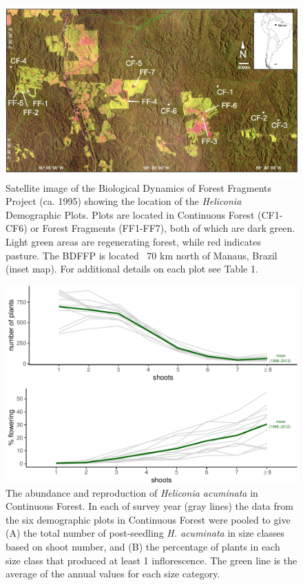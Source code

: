 \documentclass[
  man, donotrepeattitle,floatsintext]{apa6}
\begin{document}
\endgroup

\newpage

\begin{figure}[h]
\includegraphics[width=1\linewidth]{Bruna_etal_MetadataS1_files/figure-latex/map-1} \caption{Satellite image of the Biological Dynamics of Forest Fragments Project (ca. 1995) showing the location of the \textit{Heliconia} Demographic Plots. Plots are located in Continuous Forest (CF1-CF6) or Forest Fragments (FF1-FF7), both of which are dark green. Light green areas are regenerating forest, while red indicates pasture. The BDFFP is located ~70 km north of Manaus, Brazil (inset map). For additional details on each plot see Table 1.}\label{fig:map}
\end{figure}

\newpage

\begin{figure}
\centering
\includegraphics{Bruna_etal_MetadataS1_files/figure-latex/repro-1.pdf}
\caption{\label{fig:repro}The abundance and reproduction of \textit{Heliconia acuminata} in Continuous Forest. In each of survey year (gray lines) the data from the six demographic plots in Continuous Forest were pooled to give (A) the total number of post-seedling \textit{H. acuminata} in size classes based on shoot number, and (B) the percentage of plants in each size class that produced at least 1 inflorescence. The green line is the average of the annual values for each size category.}
\end{figure}
\end{document}
